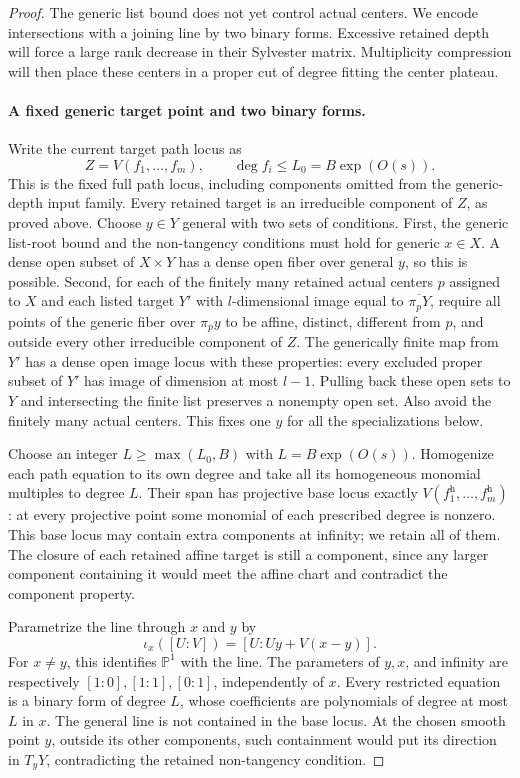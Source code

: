 \begin{proof}
The generic list bound does not yet control actual centers.  We encode intersections with a joining line by two binary forms. Excessive retained depth will force a large rank decrease in their Sylvester matrix.  Multiplicity compression will then place these centers in a proper cut of degree fitting the center plateau.

\paragraph{A fixed generic target point and two binary forms.}
Write the current target path locus as
\[
 Z=V(f_1,\ldots,f_m),\qquad \deg f_i\le L_0=B\exp(O(s)).
\]
This is the fixed full path locus, including components omitted from the generic-depth input family. Every retained target is an irreducible component of $Z$, as proved above. Choose $y\in Y$ general with two sets of conditions. First, the generic list-root bound and the non-tangency conditions must hold for generic $x\in X$. A dense open subset of $X\times Y$ has a dense open fiber over general $y$, so this is possible. Second, for each of the finitely many retained actual centers $p$ assigned to $X$ and each listed target $Y'$ with $l$-dimensional image equal to $\overline{\pi_pY}$, require all points of the generic fiber over $\pi_py$ to be affine, distinct, different from $p$, and outside every other irreducible component of $Z$. The generically finite map from $Y'$ has a dense open image locus with these properties: every excluded proper subset of $Y'$ has image of dimension at most $l-1$. Pulling back these open sets to $Y$ and intersecting the finite list preserves a nonempty open set. Also avoid the finitely many actual centers. This fixes one $y$ for all the specializations below.

Choose an integer $L\ge\max(L_0,B)$ with $L=B\exp(O(s))$. Homogenize each path equation to its own degree and take all its homogeneous monomial multiples to degree $L$. Their span has projective base locus exactly $V(f_1^{\mathrm h},\ldots,f_m^{\mathrm h})$: at every projective point some monomial of each prescribed degree is nonzero. This base locus may contain extra components at infinity; we retain all of them. The closure of each retained affine target is still a component, since any larger component containing it would meet the affine chart and contradict the component property.

Parametrize the line through $x$ and $y$ by
\[
 \iota_x([U:V])=[U:Uy+V(x-y)].
\]
For $x\ne y$, this identifies $\mathbb{P}^1$ with the line. The parameters of $y,x$, and infinity are respectively $[1:0],[1:1],[0:1]$, independently of $x$. Every restricted equation is a binary form of degree $L$, whose coefficients are polynomials of degree at most $L$ in $x$. The general line is not contained in the base locus. At the chosen smooth point $y$, outside its other components, such containment would put its direction in $T_yY$, contradicting the retained non-tangency condition.


\end{proof}
